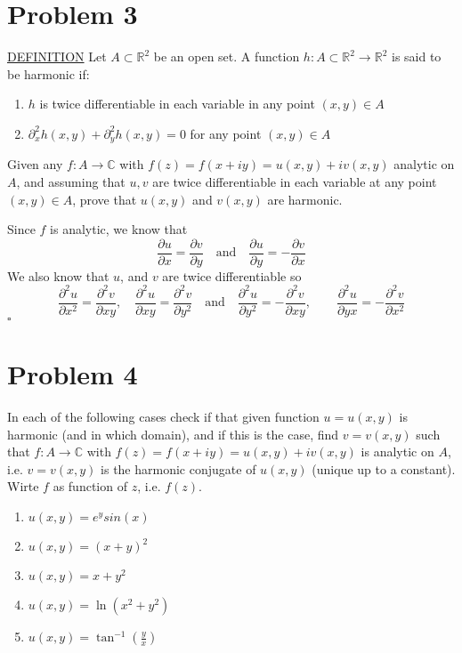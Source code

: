 \documentclass[12pt]{article}
\newcommand{\C}{\mathbb{C}}
\newcommand{\R}{\mathbb{R}}
\newenvironment{proof}{\noindent{\bf Proof.}}{\hfill $\square$\medskip}
\begin{document}
\section{Problem 3}
\underline{DEFINITION} Let $A\subset\R^{2}$ be an open set. A function $h:A\subset\R^{2}\rightarrow\R^{2}$ is said to be harmonic if:
\begin{enumerate}
    \item $h$ is twice differentiable in each variable in any point $(x,y)\in A$
    \item $\partial_{x}^{2}h(x,y)+\partial_{y}^{2}h(x,y)=0$ for any point $(x,y)\in A$
\end{enumerate}
Given any $f:A\rightarrow\C$ with $f(z)=f(x+iy)=u(x,y)+iv(x,y)$ analytic on $A$, and assuming that $u,v$ are twice differentiable in each variable at any point $(x,y)\in A$, prove that $u(x,y)$ and $v(x,y)$ are harmonic.

\begin{proof}
Since $f$ is analytic, we know that
$$\frac{\partial u}{\partial x}=\frac{\partial v}{\partial y}\quad\text{and}\quad\frac{\partial u}{\partial y}=-\frac{\partial v}{\partial x}$$
We also know that $u$, and $v$ are twice differentiable so
$$\frac{\partial^{2}u}{\partial x^{2}}=\frac{\partial^{2}v}{\partial xy},\quad\frac{\partial^{2}u}{\partial xy}=\frac{\partial^{2}v}{\partial y^{2}}\quad\text{and}\quad\frac{\partial^{2}u}{\partial y^{2}}=-\frac{\partial^{2}v}{\partial xy},\quad \quad\frac{\partial^{2}u}{\partial yx}=-\frac{\partial^{2}v}{\partial x^{2}}$$
\end{proof}


\section{Problem 4}
In each of the following cases check if that given function $u=u(x,y)$ is harmonic (and in which domain), and if this is the case, find $v=v(x,y)$ such that $f:A\rightarrow\C$ with $f(z)=f(x+iy)=u(x,y)+iv(x,y)$ is analytic on $A$, i.e. $v=v(x,y)$ is the harmonic conjugate of $u(x,y)$ (unique up to a constant). Wirte $f$ as function of $z$, i.e. $f(z)$.
\begin{enumerate}[label=\textbf{(\alph*)}]
    \item $u(x,y)=e^{y}sin(x)$
    \item $u(x,y)=(x+y)^{2}$
    \item $u(x,y)=x+y^{2}$
    \item $u(x,y)=\ln(x^{2}+y^{2})$
    \item $u(x,y)=\tan^{-1}(\frac{y}{x})$
\end{enumerate}
\end{document}
